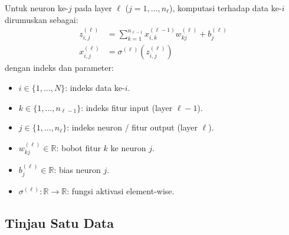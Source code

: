 \documentclass[11pt,a4paper]{article}
\theoremstyle{plain}
\theoremstyle{definition}
\theoremstyle{remark}
\begin{document}
Untuk neuron ke-$j$ pada layer $\ell$ ($j = 1, \dots, n_\ell$), komputasi terhadap data ke-$i$ dirumuskan sebagai:
\begin{align}
    z^{(\ell)}_{i, j} &= \sum_{k=1}^{n_{\ell-1}} x^{(\ell-1)}_{i, k} w^{(\ell)}_{kj} + b^{(\ell)}_j \label{eq:scalar_z} \\
    x^{(\ell)}_{i, j} &= \sigma^{(\ell)}\left( z^{(\ell)}_{i, j} \right) \label{eq:scalar_x}
\end{align}
dengan indeks dan parameter:
\begin{itemize}\setlength{\itemsep}{-2pt}\setlength{\parsep}{0pt}\setlength{\topsep}{0pt}
    \item $i \in \{1, \dots, N\}$: indeks data ke-$i$.
    \item $k \in \{1, \dots, n_{\ell-1}\}$: indeks fitur input (layer $\ell-1$).
    \item $j \in \{1, \dots, n_\ell\}$: indeks neuron / fitur output (layer $\ell$).
    \item $w^{(\ell)}_{kj} \in \mathbb{R}$: bobot fitur $k$ ke neuron $j$.
    \item $b^{(\ell)}_j \in \mathbb{R}$: bias neuron $j$.
    \item $\sigma^{(\ell)}: \mathbb{R} \to \mathbb{R}$: fungsi aktivasi element-wise.
\end{itemize}

\subsection{Tinjau Satu Data}
\label{subsec:vektorisasi_layer}
\end{document}
